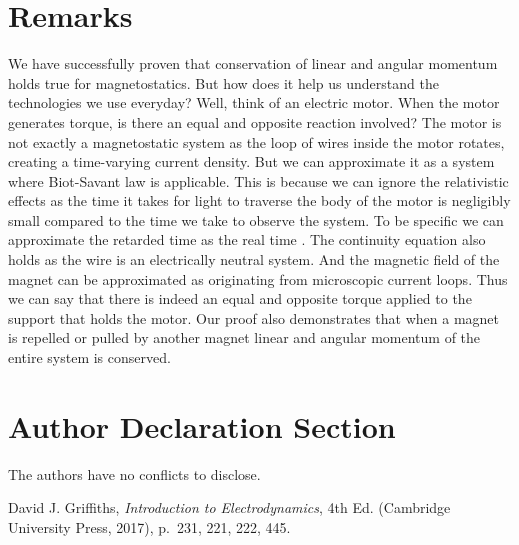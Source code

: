 \documentclass[titlepage, a4paper, 11pt]{article}
\begin{document}
\section{Remarks}
We have successfully proven that conservation of linear and angular momentum holds true for
magnetostatics. But how does it help us understand the technologies we use everyday? Well, think of
an electric motor. When the motor generates torque, is there an equal and opposite reaction
involved? The motor is not exactly a magnetostatic system as the loop of wires inside the motor
rotates, creating a time-varying current density. But we can approximate it as a system where
Biot-Savant law is applicable. This is because we can ignore the relativistic effects as the time it
takes for light to traverse the body of the motor is negligibly small compared to the time we take
to observe the system. To be specific we can approximate the retarded time as the real time
\cite{Griffiths}. The continuity equation also holds as the wire is an electrically neutral system.
And the magnetic field of the magnet can be approximated as originating from microscopic current
loops. Thus we can say that there is indeed an equal and opposite torque applied to the support that
holds the motor. Our proof also demonstrates that when a magnet is repelled or pulled by another
magnet linear and angular momentum of the entire system is conserved.

\section{Author Declaration Section}
The authors have no conflicts to disclose.

\begin{thebibliography}{1}
	 David J. Griffiths, \textit{Introduction to Electrodynamics}, 4th Ed. (Cambridge
		University Press, 2017), p.~231, 221, 222, 445.
\end{thebibliography}
\end{document}
